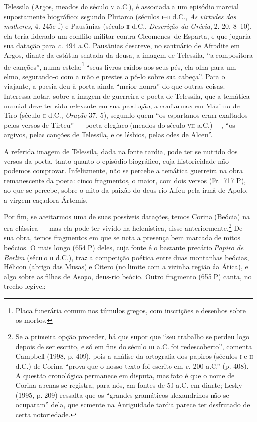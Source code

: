 Telessila (Argos, meados do século \textsc{v} a.C.), é associada a um episódio marcial
supostamente biográfico: segundo Plutarco (séculos \textsc{i}--\textsc{ii} d.C., \textit{As
virtudes das mulheres}, 4. 245c-f) e Pausânias (século \textsc{ii} d.C.,
\textit{Descrição da Grécia}, 2. 20. 8--10), ela teria liderado um conflito
militar contra Cleomenes, de Esparta, o que jogaria sua datação para \textit{c.}
494 a.C. Pausânias descreve, no santuário de Afrodite em Argos, diante da
estátua sentada da deusa, a imagem de Telessila, ``a compositora de
canções”, numa estela:\footnote{ Placa funerária comum nos túmulos gregos, com
inscrições e desenhos sobre os mortos.} ``seus livros caídos aos seus
pés, ela olha para um elmo, segurando-o com a mão e prestes a pô-lo sobre sua
cabeça”. Para o viajante, a poesia deu à poeta ainda ``maior honra” do
que outras coisas. Interessa notar, sobre a imagem de guerreira e poeta de
Telessila, que a temática marcial deve ter sido relevante em sua produção, a
confiarmos em Máximo de Tiro (século \textsc{ii} d.C., \textit{Oração} 37. 5), segundo
quem ``os espartanos eram exaltados pelos versos de Tirteu” --- 
poeta elegíaco (meados do século \textsc{vii} a.C.) ---, ``os argivos, pelas
canções de Telessila, e os lésbios, pelas odes de Alceu”. 

A referida imagem de Telessila, dada na fonte tardia, pode ter se nutrido dos
versos da poeta, tanto quanto o episódio biográfico, cuja historicidade não
podemos comprovar. Infelizmente, não se percebe a temática guerreira na obra
remanescente da poeta: cinco fragmentos, o maior, com dois versos (Fr.~717 P),
ao que se percebe, sobre o mito da paixão do deus-rio Alfeu pela irmã de Apolo,
a virgem caçadora Ártemis.

Por fim, se aceitarmos uma de suas possíveis datações, temos Corina (Beócia) na
era clássica --- mas ela pode ter vivido na helenística, disse
anteriormente.\footnote{ Se a primeira opção proceder, há que supor que “seu
trabalho se perdeu logo depois de ser escrito, e só em fins do século \textsc{iii} a.C.
foi redescoberto”, comenta Campbell (1998, p. 409), pois a análise da
ortografia dos papiros (séculos \textsc{i} e \textsc{ii} d.C.) de Corina “prova que o nosso texto
foi escrito em \textit{c.} 200 a.C.” (p. 408). A questão cronológica permanece
em disputa, mas fato é que o nome de Corina apenas se registra, para nós, em
fontes de 50 a.C. em diante; Lesky (1995, p. 209) ressalta que os “grandes
gramáticos alexandrinos não se ocuparam” dela, que somente na Antiguidade
tardia parece ter desfrutado de certa notoriedade.} De sua obra, temos
fragmentos em que se nota a presença bem marcada de mitos beócios. O mais longo
(654 P) deles, cuja fonte é o bastante precário \textit{Papiro de Berlim}
(século \textsc{ii} d.C.), traz a competição poética entre duas montanhas beócias,
Hélicon (abrigo das Musas) e Citero (no limite com a vizinha região da Ática),
e algo sobre as filhas de Asopo, deus-rio beócio. Outro fragmento (655 P)
canta, no trecho legível:

